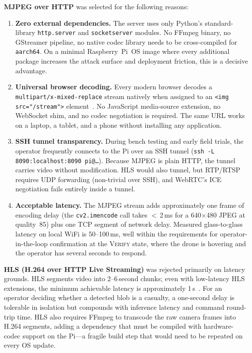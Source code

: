 \textbf{MJPEG over HTTP} was selected for the following reasons:

\begin{enumerate}
  \item \textbf{Zero external dependencies.} The server uses only Python's standard-library
        \texttt{http.server} and \texttt{socketserver} modules. No FFmpeg binary, no
        GStreamer pipeline, no native codec library needs to be cross-compiled for
        \texttt{aarch64}. On a minimal Raspberry~Pi~OS image where every additional
        package increases the attack surface and deployment friction, this is a decisive
        advantage.

  \item \textbf{Universal browser decoding.} Every modern browser decodes a
        \texttt{multipart/x-mixed-replace} stream natively when assigned to an
        \texttt{<img src="/stream">} element~\cite{munoz2016mjpeg}. No JavaScript media-source
        extension, no WebSocket shim, and no codec negotiation is required. The same URL
        works on a laptop, a tablet, and a phone without installing any application.

  \item \textbf{SSH tunnel transparency.} During bench testing and early field trials, the
        operator frequently connects to the Pi over an SSH tunnel
        (\texttt{ssh -L 8090:localhost:8090 pi@\ldots}). Because MJPEG is plain HTTP,
        the tunnel carries video without modification. HLS would also tunnel, but
        RTP/RTSP requires UDP forwarding (non-trivial over SSH), and WebRTC's ICE
        negotiation fails entirely inside a tunnel.

  \item \textbf{Acceptable latency.} The MJPEG stream adds approximately one frame of
        encoding delay (the \texttt{cv2.imencode} call takes $<$\,2\,ms for a
        640$\times$480 JPEG at quality~85) plus one TCP segment of network delay.
        Measured glass-to-glass latency on local WiFi is 50--100\,ms, well within the
        requirements for operator-in-the-loop confirmation at the \textsc{Verify} state,
        where the drone is hovering and the operator has several seconds to respond.
\end{enumerate}

\textbf{HLS (H.264 over HTTP Live Streaming)} was rejected primarily on latency grounds.
HLS segments video into 2--6\,second chunks; even with low-latency HLS extensions, the
minimum achievable latency is approximately 1\,s~\cite{apple_hls}. For an operator
deciding whether a detected blob is a casualty, a one-second delay is tolerable in
isolation but compounds with inference latency and command round-trip time. HLS also
requires FFmpeg to transcode the raw camera frames into H.264 segments, adding a
dependency that must be compiled with hardware-codec support on the Pi---a fragile
build step that would need to be repeated on every OS update.

